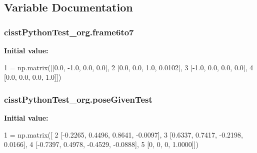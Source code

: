 \subsection{Variable Documentation}
\subsubsection[{\texorpdfstring{frame6to7}{frame6to7}}]{\setlength{\rightskip}{0pt plus 5cm}cisst\+Python\+Test\+\_\+org.\+frame6to7}\hypertarget{namespacecisstPythonTest__org_a0f2ea91d074614118cd30d3c6e55dd2e}{}\label{namespacecisstPythonTest__org_a0f2ea91d074614118cd30d3c6e55dd2e}
{\bfseries Initial value\+:}
\begin{DoxyCode}
1 = np.matrix([[0.0, -1.0, 0.0, 0.0],
2                      [0.0,  0.0, 1.0, 0.0102],
3                      [-1.0, 0.0, 0.0, 0.0],
4                      [0.0,  0.0, 0.0, 1.0]])
\end{DoxyCode}
\subsubsection[{\texorpdfstring{pose\+Given\+Test}{poseGivenTest}}]{\setlength{\rightskip}{0pt plus 5cm}cisst\+Python\+Test\+\_\+org.\+pose\+Given\+Test}\hypertarget{namespacecisstPythonTest__org_a99cea03d32f1a622f4be991be3eed51d}{}\label{namespacecisstPythonTest__org_a99cea03d32f1a622f4be991be3eed51d}
{\bfseries Initial value\+:}
\begin{DoxyCode}
1 = np.matrix([
2     [-0.2265,    0.4496,    0.8641,   -0.0097],
3     [0.6337,    0.7417,   -0.2198,    0.0166],
4     [-0.7397,    0.4978,   -0.4529,   -0.0888],
5          [0,         0,         0,    1.0000]])
\end{DoxyCode}
